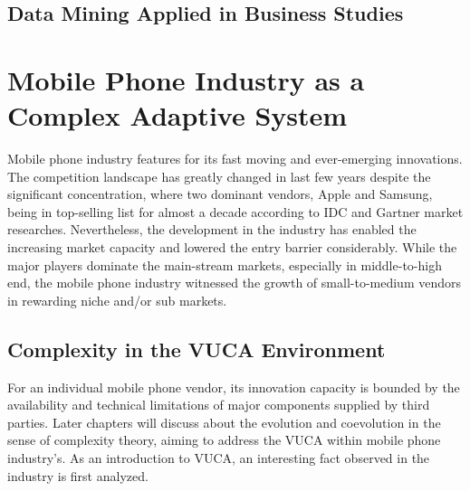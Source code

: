 \documentclass[utf8,english]{gradu3}
\begin{document}
\section{Data Mining Applied in Business Studies}

\chapter{Mobile Phone Industry as a Complex Adaptive System}

Mobile phone industry features for its fast moving and ever-emerging innovations. The competition landscape has greatly changed in last few years despite the significant concentration, where two dominant vendors, Apple and Samsung, being in top-selling list for almost a decade according to IDC and Gartner market researches. Nevertheless, the development in the industry has enabled the increasing market capacity and lowered the entry barrier considerably. While the major players dominate the main-stream markets, especially in middle-to-high end, the mobile phone industry witnessed the growth of small-to-medium vendors in rewarding niche and/or sub markets.

\section{Complexity in the VUCA Environment}

For an individual mobile phone vendor, its innovation capacity is bounded by the availability and technical limitations of major components supplied by third parties. Later chapters will discuss about the evolution and coevolution in the sense of complexity theory, aiming to address the VUCA within mobile phone industry's. As an introduction to VUCA, an interesting fact observed in the industry is first analyzed.
\end{document}

